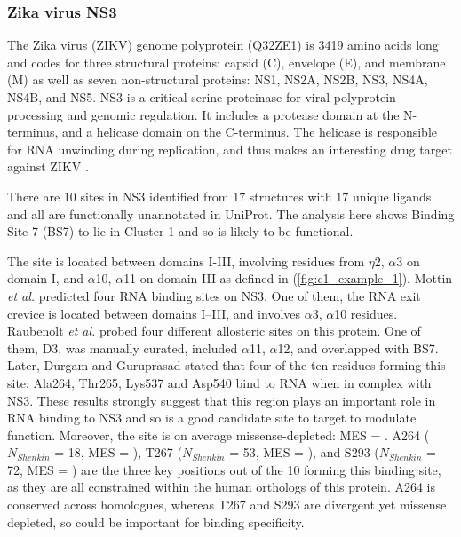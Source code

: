 \subsubsection{Zika virus NS3}

The Zika virus (ZIKV) genome polyprotein (\href{https://www.uniprot.org/uniprotkb/Q32ZE1/entry}{Q32ZE1}) is 3419 amino acids long and codes for three structural proteins: capsid (C), envelope (E), and membrane (M) as well as seven non-structural proteins: NS1, NS2A, NS2B, NS3, NS4A, NS4B, and NS5. NS3 is a critical serine proteinase for viral polyprotein processing and genomic regulation. It includes a protease domain at the N-terminus, and a helicase domain on the C-terminus. The helicase is responsible for RNA unwinding during replication, and thus makes an interesting drug target against ZIKV \cite{LUO_2015_FLAVIVIRUS}.

There are 10 sites in NS3 identified from 17 structures with 17 unique ligands and all are functionally unannotated in UniProt. The analysis here shows Binding Site 7 (BS7) to lie in Cluster 1 and so is likely to be functional.

The site is located between domains I-III, involving residues from $\eta$2, $\alpha$3 on domain I, and $\alpha$10, $\alpha$11 on domain III as defined in \cite{TIAN_2016_ZIKV} (\autoref{fig:c1_example_1}). Mottin \textit{et al.} \cite{MOTTIN_2017_ZIKA_HELICASE} predicted four RNA binding sites on NS3. One of them, the RNA exit crevice is located between domains I–III, and involves $\alpha$3, $\alpha$10 residues. Raubenolt \textit{et al.} \cite{RAUBENOLT_2021_ZIKA_ALLOSTERIC} probed four different allosteric sites on this protein. One of them, D3, was manually curated, included $\alpha$11, $\alpha$12, and overlapped with BS7. Later, Durgam and Guruprasad \cite{DURGAM_2022_ZIKA_ATP} stated that four of the ten residues forming this site: Ala264, Thr265, Lys537 and Asp540 bind to RNA when in complex with NS3. These results strongly suggest that this region plays an important role in RNA binding to NS3 and so is a good candidate site to target to modulate function. Moreover, the site is on average missense-depleted: MES =  . A264 ($N_{Shenkin}$ = 18, MES = ), T267 ($N_{Shenkin}$ = 53, MES = ), and S293 ($N_{Shenkin}$ = 72, MES =  ) are the three key positions out of the 10 forming this binding site, as they are all constrained within the human orthologs of this protein. A264 is conserved across homologues, whereas T267 and S293 are divergent yet missense depleted, so could be important for binding specificity.

